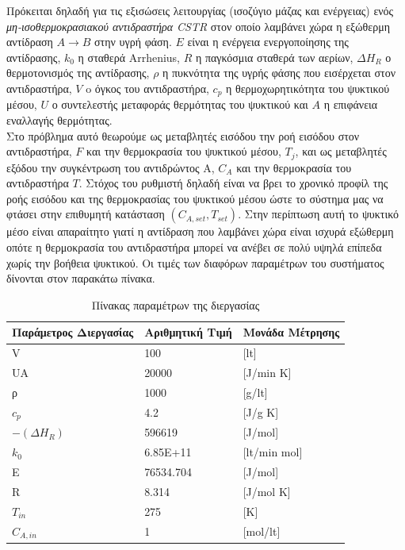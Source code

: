 \documentclass[11pt]{article} %
\numberwithin{equation}{subsection}
\begin{document}
Πρόκειται δηλαδή για τις εξισώσεις λειτουργίας (ισοζύγιο μάζας και ενέργειας) ενός \textit{μη-ισοθερμοκρασιακού αντιδραστήρα CSTR} στον οποίο λαμβάνει χώρα η εξώθερμη αντίδραση $Α \rightarrow B$ στην υγρή φάση. $Ε$ είναι η ενέργεια ενεργοποίησης της αντίδρασης, $k_{0}$ η σταθερά Arrhenius, $R$ η παγκόσμια σταθερά των αερίων, $ΔΗ_{R}$ ο θερμοτονισμός της αντίδρασης, $\rho$ η πυκνότητα της υγρής φάσης που εισέρχεται στον αντιδραστήρα, $V$ o όγκος του αντιδραστήρα, $c_{p}$ η θερμοχωρητικότητα του ψυκτικού μέσου, $U$ ο συντελεστής μεταφοράς θερμότητας του ψυκτικού και $Α$ η επιφάνεια εναλλαγής θερμότητας.\\

Στο πρόβλημα αυτό θεωρούμε ως μεταβλητές εισόδου την ροή εισόδου στον αντιδραστήρα, $F$ και την θερμοκρασία του ψυκτικού μέσου, $Τ_{j}$, και ως μεταβλητές εξόδου την συγκέντρωση του αντιδρώντος Α, $C_{A}$ και την θερμοκρασία του αντιδραστήρα $Τ$. Στόχος του ρυθμιστή δηλαδή είναι να βρει το χρονικό προφίλ της ροής εισόδου και της θερμοκρασίας του ψυκτικού μέσου ώστε το σύστημα μας να φτάσει στην επιθυμητή κατάσταση $(C_{A,set},T_{set})$. Στην περίπτωση αυτή το ψυκτικό μέσο είναι απαραίτητο γιατί η αντίδραση που λαμβάνει χώρα είναι ισχυρά εξώθερμη οπότε η θερμοκρασία του αντιδραστήρα μπορεί να ανέβει σε πολύ υψηλά επίπεδα χωρίς την βοήθεια ψυκτικού. Οι τιμές των διαφόρων παραμέτρων του συστήματος δίνονται στον παρακάτω πίνακα.\\
\begin{table}[H]
\centering
\begin{tabular}{ |p{3cm}|p{3cm}|p{3cm}| }
\hline
Παράμετρος Διεργασίας& Αριθμητική Τιμή& Μονάδα Μέτρησης \\
\hline
V  & 100 &[lt] \\
UA & 20000   & [J/min K] \\
ρ  &1000 & [g/lt] \\

$c_{p}$   &4.2 & [J/g K] \\
$-(ΔΗ_{R})$ & 596619 & [J/mol] \\
$k_{0}$ & 6.85E+11 & [lt/min mol]   \\
E & 76534.704 & [J/mol] \\
R & 8.314 & [J/mol K]\\
$T_{in}$ & 275 & [K]\\
$C_{A,in}$ & 1 & [mol/lt]\\
\hline
\end{tabular}
\caption{Πίνακας παραμέτρων της διεργασίας}
\label{table:10}
\end{table}
\end{document}
